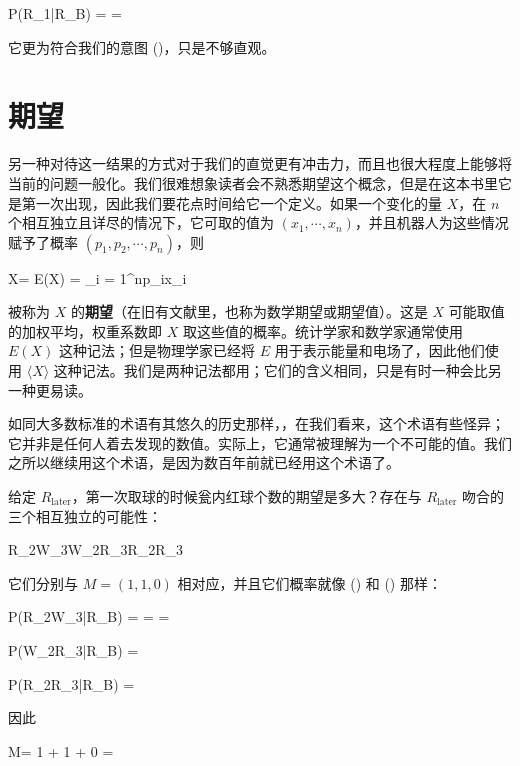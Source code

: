 \placeformula[3-65]
\startformula
P(R_1|R_{}B) =  = 
\stopformula

它更为符合我们的意图 (\in[3-57])，只是不够直观。

\section{期望}

另一种对待这一结果的方式对于我们的直觉更有冲击力，而且也很大程度上能够将当前的问题一般化。我们很难想象读者会不熟悉期望这个概念，但是在这本书里它是第一次出现，因此我们要花点时间给它一个定义。如果一个变化的量 $X$，在 $n$ 个相互独立且详尽的情况下，它可取的值为 $(x_1,\cdots,x_n)$，并且机器人为这些情况赋予了概率 $(p_1,p_2,\cdots,p_n)$，则

\placeformula[3-66]
\startformula
\langle X\rangle = E(X) = \sum_{i = 1}^np_ix_i
\stopformula

被称为 $X$ 的{\bf 期望}（在旧有文献里，也称为数学期望或期望值）。这是 $X$ 可能取值的加权平均，权重系数即 $X$ 取这些值的概率。统计学家和数学家通常使用 $E(X)$ 这种记法；但是物理学家已经将 $E$ 用于表示能量和电场了，因此他们使用 $\langle X\rangle$ 这种记法。我们是两种记法都用；它们的含义相同，只是有时一种会比另一种更易读。

如同大多数标准的术语有其悠久的历史那样，，在我们看来，这个术语有些怪异；它并非是任何人着去发现的数值。实际上，它通常被理解为一个不可能的值。我们之所以继续用这个术语，是因为数百年前就已经用这个术语了。

给定 $R_{\text{later}}$，第一次取球的时候瓮内红球个数的期望是多大？存在与 $R_{\text{later}}$ 吻合的三个相互独立的可能性：

\placeformula[3-67]
\startformula
R_2W_3\quad W_2R_3\quad R_2R_3
\stopformula

它们分别与 $M = (1, 1, 0)$ 相对应，并且它们概率就像 (\in[3-64]) 和 (\in[3-65]) 那样：

\placeformula[3-68]
\startformula
P(R_2W_3|R_{}B) =  =  = 
\stopformula

\placeformula[3-69]
\startformula
P(W_2R_3|R_{}B) = 
\stopformula

\placeformula[3-70]
\startformula
P(R_2R_3|R_{}B) = 
\stopformula

因此

\placeformula[3-71]
\startformula
\langle M\rangle = 1\times{} + 1\times{} + 0\times{} = 
\stopformula

